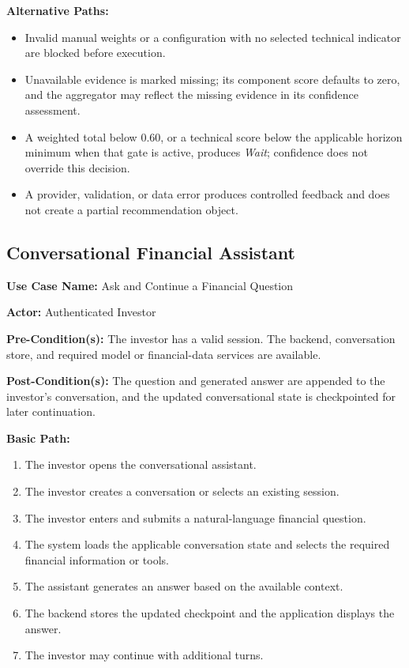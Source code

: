 \noindent\textbf{Alternative Paths:}
\begin{itemize}[leftmargin=*, nosep]
    \item Invalid manual weights or a configuration with no selected technical indicator are blocked before execution.
    \item Unavailable evidence is marked missing; its component score defaults to zero, and the aggregator may reflect the missing evidence in its confidence assessment.
    \item A weighted total below 0.60, or a technical score below the applicable horizon minimum when that gate is active, produces \textit{Wait}; confidence does not override this decision.
    \item A provider, validation, or data error produces controlled feedback and does not create a partial recommendation object.
\end{itemize}

\subsection{Conversational Financial Assistant}
\label{subsec:conversational-financial-assistant}

\noindent\textbf{Use Case Name:} Ask and Continue a Financial Question

\noindent\textbf{Actor:} Authenticated Investor

\noindent\textbf{Pre-Condition(s):} The investor has a valid session. The backend, conversation store, and required model or financial-data services are available.

\noindent\textbf{Post-Condition(s):} The question and generated answer are appended to the investor's conversation, and the updated conversational state is checkpointed for later continuation.

\noindent\textbf{Basic Path:}
\begin{enumerate}[leftmargin=*, nosep]
    \item The investor opens the conversational assistant.
    \item The investor creates a conversation or selects an existing session.
    \item The investor enters and submits a natural-language financial question.
    \item The system loads the applicable conversation state and selects the required financial information or tools.
    \item The assistant generates an answer based on the available context.
    \item The backend stores the updated checkpoint and the application displays the answer.
    \item The investor may continue with additional turns.
\end{enumerate}

